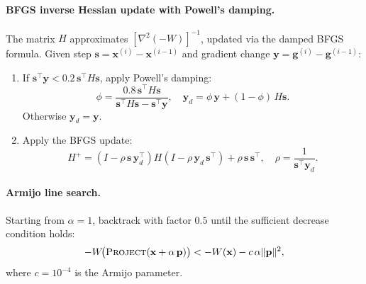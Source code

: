 \documentclass[11pt,a4paper]{article}
\begin{document}
\paragraph{BFGS inverse Hessian update with Powell's damping.}
The matrix $H$ approximates $[\nabla^2(-W)]^{-1}$, updated via the damped BFGS formula.
Given step $\mathbf{s} = \mathbf{x}^{(i)} - \mathbf{x}^{(i-1)}$ and gradient change $\mathbf{y} = \mathbf{g}^{(i)} - \mathbf{g}^{(i-1)}$:
\begin{enumerate}
    \item If $\mathbf{s}^\top \mathbf{y} < 0.2\, \mathbf{s}^\top H \mathbf{s}$, apply Powell's damping:
    \begin{equation}
        \phi = \frac{0.8\, \mathbf{s}^\top H \mathbf{s}}{\mathbf{s}^\top H \mathbf{s} - \mathbf{s}^\top \mathbf{y}}, \quad
        \mathbf{y}_d = \phi\, \mathbf{y} + (1-\phi)\, H \mathbf{s}.
    \end{equation}
    Otherwise $\mathbf{y}_d = \mathbf{y}$.
    \item Apply the BFGS update:
    \begin{equation}
        H^+ = \left(I - \rho\, \mathbf{s}\, \mathbf{y}_d^\top\right) H \left(I - \rho\, \mathbf{y}_d\, \mathbf{s}^\top\right) + \rho\, \mathbf{s}\, \mathbf{s}^\top,
        \quad \rho = \frac{1}{\mathbf{s}^\top \mathbf{y}_d}.
        \label{eq:bfgs}
    \end{equation}
\end{enumerate}

\paragraph{Armijo line search.}
Starting from $\alpha = 1$, backtrack with factor $0.5$ until the sufficient decrease condition holds:
\begin{equation}
    -W\!\bigl(\textsc{Project}(\mathbf{x} + \alpha\, \mathbf{p})\bigr) < -W(\mathbf{x}) - c\, \alpha \|\mathbf{p}\|^2,
    \label{eq:armijo}
\end{equation}
where $c = 10^{-4}$ is the Armijo parameter.
\end{document}
